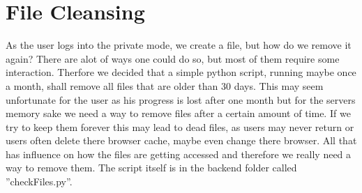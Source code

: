 \section{File Cleansing}
As the user logs into the private mode, we create a file, but how do we remove it again?
There are alot of ways one could do so, but most of them require some interaction.
Therfore we decided that a simple python script, running maybe once a month, shall remove all files that are older than 30 days.
This may seem unfortunate for the user as his progress is lost after one month but for the servers memory sake we need a way to remove files after a certain amount of time.
If we try to keep them forever this may lead to dead files, as users may never return or users often delete there browser cache, maybe even change there browser.
All that has influence on how the files are getting accessed and therefore we really need a way to remove them.
The script itself is in the backend folder called ''checkFiles.py''.